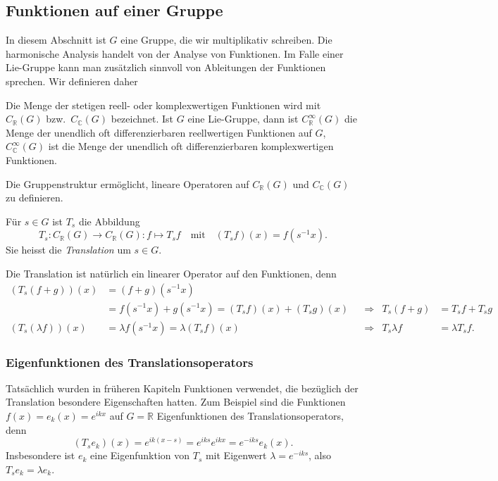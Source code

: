 %
%
%

%
%
\subsection{Funktionen auf einer Gruppe
\label{buch:gruppen:subsection:funktionen}}
In diesem Abschnitt ist $G$ eine Gruppe, die wir multiplikativ
schreiben.
Die harmonische Analysis handelt von der Analyse von Funktionen.
Im Falle einer Lie-Gruppe kann man zusätzlich sinnvoll von Ableitungen
der Funktionen sprechen.
Wir definieren daher

\begin{definition}
\label{buch:gruppen:gruppe:def:funktionenaufgruppe}
Die Menge der stetigen reell- oder komplexwertigen Funktionen wird mit
$C_{\mathbb{R}}(G)$ bzw.~$C_{\mathbb{C}}(G)$ bezeichnet.
Ist $G$ eine Lie-Gruppe, dann ist
$C_{\mathbb{R}}^\infty(G)$ die Menge der unendlich oft differenzierbaren
reellwertigen Funktionen auf $G$,
$C_{\mathbb{C}}^\infty(G)$ ist die Menge der unendlich oft differenzierbaren
komplexwertigen Funktionen.
\end{definition}

Die Gruppenstruktur ermöglicht, lineare Operatoren auf $C_{\mathbb{R}}(G)$
und $C_{\mathbb{C}}(G)$ zu definieren.

\begin{definition}
\label{buch:gruppen:gruppe:def:translation}
Für $s\in G$ ist $T_s$ die Abbildung
\[
T_s
\colon
C_{\mathbb{R}}(G) \to C_{\mathbb{R}}(G)
:
f \mapsto T_sf
\quad
\text{mit}
\quad
(T_sf)(x) = f(s^{-1}x).
\]
Sie heisst die {\em Translation} um $s\in G$.
\end{definition}

Die Translation ist natürlich ein linearer Operator auf den Funktionen, denn
\begin{align*}
(T_s(f+g))(x)
&=
(f+g)(s^{-1}x)
\\
&=
f(s^{-1}x) + g(s^{-1}x)
=
(T_sf)(x) + (T_sg)(x)
&&\Rightarrow&
T_s(f+g)&=T_sf+T_sg
\\
(T_s(\lambda f))(x)
&=
\lambda f(s^{-1}x)
=
\lambda (T_sf)(x)
&&\Rightarrow&
T_s\lambda f
&=
\lambda T_sf.
\end{align*}

%
%
\subsubsection{Eigenfunktionen des Translationsoperators}
Tatsächlich wurden in früheren Kapiteln Funktionen verwendet, die
bezüglich der Translation besondere Eigenschaften hatten.
Zum Beispiel sind die Funktionen $f(x)=e_k(x)=e^{ikx}$ auf $G=\mathbb{R}$
Eigenfunktionen des Translationsoperators, denn
\[
(T_se_k)(x)
=
e^{ik(x-s)}
=
e^{iks}e^{ikx}
=
e^{-iks} e_k(x).
\]
Insbesondere ist $e_k$ eine Eigenfunktion von $T_s$ mit Eigenwert
$\lambda=e^{-iks}$, also $T_se_k = \lambda e_k$.

